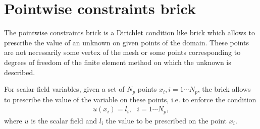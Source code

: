\documentclass[a4paper,11pt,english]{sphinxmanual}
\begin{document}
\begin{sphinxVerbatim}[commandchars=\\\{\}]
  
                                          
                                          


  
                                          
                                          

  
                                          
                                          


  
                                           
                                           
\end{sphinxVerbatim}


\section{Pointwise constraints brick}
\label{\detokenize{userdoc/model_dirichlet:pointwise-constraints-brick}}
The pointwise constraints brick is a Dirichlet condition like brick which allows to prescribe the value of an unknown on given points of the domain. These points are not necessarily some vertex of the mesh or some points corresponding to degrees of freedom of the finite element method on which the unknown is described.

For scalar field variables, given a set of \(N_p\) points \(x_i, i = 1\cdots N_p\), the brick allows to prescribe the value of the variable on these points, i.e. to enforce the condition
\begin{equation*}
\begin{split}u(x_i) = l_i, ~~~ i = 1\cdots N_p,\end{split}
\end{equation*}
where \(u\) is the scalar field and \(l_i\) the value to be prescribed on the point \(x_i\).
\end{document}
